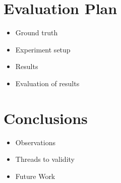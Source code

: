 \documentclass[conference]{IEEEtran}
\begin{document}
\section{Evaluation Plan}
\label{section:evaluation}

\begin{itemize}
    \item Ground truth 
    \item Experiment setup
    \item Results
    \item Evaluation of results
\end{itemize}


\section{Conclusions}\label{section:conclusion}

\begin{itemize}
    \item Observations
    \item Threads to validity
    \item Future Work
\end{itemize}



\end{document}
